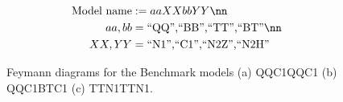 
\begin{align}
  \mbox{Model name} & := aaXXbbYY  \nn \\
  aa,bb & = \mbox{``QQ'',``BB'',``TT'',``BT''}  \nn \\
  XX,YY & = \mbox{``N1'',``C1'',``N2Z'',``N2H''} 
\end{align}




\begin{figure}[h]
  \centering
    \caption{ Feymann diagrams for the Benchmark models (a) QQC1QQC1 (b) QQC1BTC1 (c) TTN1TTN1. }
    \label{fig:Introduction::refModels}
\end{figure}



